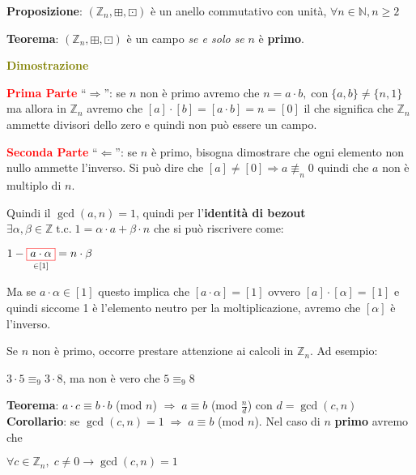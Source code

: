 \begin{flushleft}
    \textbf{Proposizione}: $(\mathbb{Z}_n, \boxplus, \boxdot)$ è un anello commutativo con unità, $\forall n \in \mathbb{N}, n \geq 2$ 

    \textbf{Teorema}: $(\mathbb{Z}_n, \boxplus, \boxdot)$ è un campo \textit{se e solo se} $n$ è \textbf{primo}.

    \begin{boxA}
        \textcolor{olive}{\textbf{Dimostrazione}}
        
        \textcolor{red}{\textbf{Prima Parte}} ``$\Rightarrow$'': se $n$ non è primo avremo che $n = a \cdot b, \; \text{con} \; \{a, b\} \neq \{n, 1\}$ ma allora in $\mathbb{Z}_n$ avremo che $[a] \cdot [b] = [a \cdot b] = n = [0]$ il che significa che $\mathbb{Z}_n$ ammette divisori dello zero e quindi non può essere un campo.

        \textcolor{red}{\textbf{Seconda Parte}} ``$\Leftarrow$'': se $n$ è primo, bisogna dimostrare che ogni elemento non nullo ammette l'inverso. Si può dire che $[a] \neq [0] \Rightarrow a \not \equiv_n 0$ quindi che $a$ non è multiplo di $n$.

        Quindi il $\gcd (a, n) = 1$, quindi per l'\textbf{identità di bezout} $\exists \alpha, \beta \in \mathbb{Z} \; \text{t.c.} \; 1 = \alpha \cdot a + \beta \cdot n$ che si può riscrivere come:

        {\centering
            $1 - \underset{\in [1]}{\fcolorbox{red}{white}{$a \cdot \alpha$}} = n \cdot \beta$
        \par}
        Ma se $a \cdot \alpha \in [1]$ questo implica che $[a \cdot \alpha] = [1]$ ovvero $[a] \cdot [\alpha] = [1]$ e quindi siccome 1 è l'elemento neutro per la moltiplicazione, avremo che $[\alpha]$ è l'inverso.
    \end{boxA}

    Se $n$ non è primo, occorre prestare attenzione ai calcoli in $\mathbb{Z}_n$. Ad esempio:

    {\centering
        $3 \cdot 5 \equiv_9 3 \cdot 8$, ma non è vero che $5 \equiv_9 8$
    \par}
    \textbf{Teorema}: $a \cdot c \equiv b \cdot b$ (mod $n$) $\Rightarrow \; a \equiv b$ (mod $\frac{n}{d}$) con $d = \gcd (c, n)$ \\
    \textbf{Corollario}: se $\gcd (c, n) = 1 \; \Rightarrow \; a \equiv b$ (mod $n$). Nel caso di $n$ \textbf{primo} avremo che 
    
    {\centering
        $\forall c \in \mathbb{Z}_n, \; c \neq 0 \rightarrow \gcd (c, n) = 1$
    \par}
\end{flushleft}

